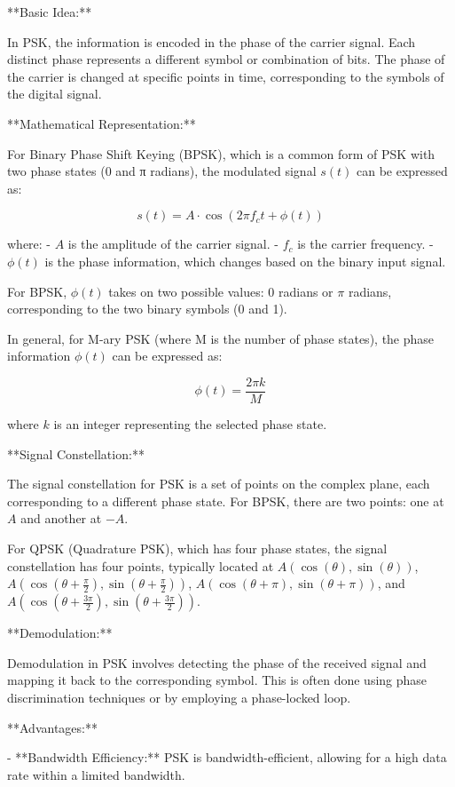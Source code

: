 \documentclass[../../../../DMCC-My-Notebook]{subfiles}
\begin{document}
	**Basic Idea:**
	
	In PSK, the information is encoded in the phase of the carrier signal. Each distinct phase represents a different symbol or combination of bits. The phase of the carrier is changed at specific points in time, corresponding to the symbols of the digital signal.
	
	**Mathematical Representation:**
	
	For Binary Phase Shift Keying (BPSK), which is a common form of PSK with two phase states (0 and π radians), the modulated signal \(s(t)\) can be expressed as:
	
	\[ s(t) = A \cdot \cos(2\pi f_c t + \phi(t)) \]
	
	where:
	- \( A \) is the amplitude of the carrier signal.
	- \( f_c \) is the carrier frequency.
	- \( \phi(t) \) is the phase information, which changes based on the binary input signal.
	
	For BPSK, \( \phi(t) \) takes on two possible values: 0 radians or \( \pi \) radians, corresponding to the two binary symbols (0 and 1).
	
	In general, for M-ary PSK (where M is the number of phase states), the phase information \( \phi(t) \) can be expressed as:
	
	\[ \phi(t) = \frac{2\pi k}{M} \]
	
	where \( k \) is an integer representing the selected phase state.
	
	**Signal Constellation:**
	
	The signal constellation for PSK is a set of points on the complex plane, each corresponding to a different phase state. For BPSK, there are two points: one at \(A\) and another at \(-A\).
	
	For QPSK (Quadrature PSK), which has four phase states, the signal constellation has four points, typically located at \(A(\cos(\theta), \sin(\theta))\), \(A(\cos(\theta + \frac{\pi}{2}), \sin(\theta + \frac{\pi}{2}))\), \(A(\cos(\theta + \pi), \sin(\theta + \pi))\), and \(A(\cos(\theta + \frac{3\pi}{2}), \sin(\theta + \frac{3\pi}{2}))\).
	
	**Demodulation:**
	
	Demodulation in PSK involves detecting the phase of the received signal and mapping it back to the corresponding symbol. This is often done using phase discrimination techniques or by employing a phase-locked loop.
	
	**Advantages:**
	
	- **Bandwidth Efficiency:** PSK is bandwidth-efficient, allowing for a high data rate within a limited bandwidth.
	
\end{document}
